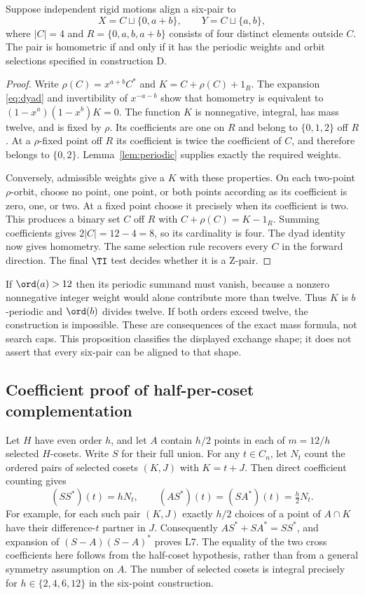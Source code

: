 \begin{proposition}\label{prop:dyadshape}
Suppose independent rigid motions align a six-pair to
\[
 X=C\sqcup\{0,a+b\},\qquad Y=C\sqcup\{a,b\},
\]
where $|C|=4$ and $R=\{0,a,b,a+b\}$ consists of four distinct elements
outside $C$. The pair is homometric if and only if it has the periodic
weights and orbit selections specified in construction D.
\end{proposition}
\begin{proof}
Write $\rho(C)=x^{a+b}C^*$ and $K=C+\rho(C)+1_R$.
The expansion \eqref{eq:dyad} and invertibility of $x^{-a-b}$ show that
homometry is equivalent to $(1-x^a)(1-x^b)K=0$. The function $K$ is
nonnegative, integral, has mass twelve, and is fixed by $\rho$.
Its coefficients are one on $R$ and belong to $\{0,1,2\}$ off $R$.
At a $\rho$-fixed point off $R$ its coefficient is twice the coefficient
of $C$, and therefore belongs to $\{0,2\}$. Lemma~\ref{lem:periodic}
supplies exactly the required weights.

Conversely, admissible weights give a $K$ with these properties. On each
two-point $\rho$-orbit, choose no point, one point, or both points according
as its coefficient is zero, one, or two. At a fixed point choose it
precisely when its coefficient is two. This produces a binary set $C$
off $R$ with $C+\rho(C)=K-1_R$. Summing coefficients gives
$2|C|=12-4=8$, so its cardinality is four. The dyad identity now gives
homometry. The same selection rule recovers every $C$ in the forward
direction. The final $\TI$ test decides whether it is a Z-pair.
\end{proof}

If $\ord(a)>12$ then its periodic summand must vanish, because a nonzero
nonnegative integer weight would alone contribute more than twelve.
Thus $K$ is $b$-periodic and $\ord(b)$ divides twelve. If both orders
exceed twelve, the construction is impossible. These are consequences
of the exact mass formula, not search caps. This proposition classifies
the displayed exchange shape; it does not assert that every six-pair
can be aligned to that shape.

\subsection{Coefficient proof of half-per-coset complementation}
Let $H$ have even order $h$, and let $A$ contain $h/2$ points in each
of $m=12/h$ selected $H$-cosets. Write $S$ for their full union. For
any $t\in C_n$, let $N_t$ count the ordered pairs of selected cosets
$(K,J)$ with $K=t+J$. Then direct coefficient counting gives
\[
 (SS^*)(t)=hN_t,\qquad
 (AS^*)(t)=(SA^*)(t)=\tfrac h2N_t.
\]
For example, for each such pair $(K,J)$ exactly $h/2$ choices of a point
of $A\cap K$ have their difference-$t$ partner in $J$. Consequently
$AS^*+SA^*=SS^*$, and expansion of $(S-A)(S-A)^*$ proves L7.
The equality of the two cross coefficients here follows from the
half-coset hypothesis, rather than from a general symmetry assumption
on $A$. The number of selected cosets is integral precisely for
$h\in\{2,4,6,12\}$ in the six-point construction.

